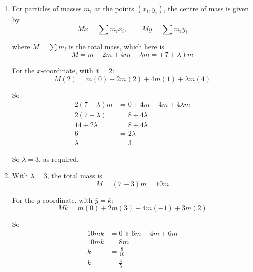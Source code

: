 \documentclass[leqno]{article}
\begin{document}
\begin{enumerate}[
  label=\textbf{\arabic*.},
  leftmargin=*,
  topsep=0pt,
  partopsep=0pt,
  parsep=0pt
]
\vspace*{10pt}

\begin{djsSolution}
\begin{enumerate}[label=\textbf{(\alph*)}, start=1]
  \item For particles of masses \(m_i\) at the points \((x_i,y_i)\), the centre of mass is given by
\[
M\bar{x}=\sum m_ix_i,\qquad M\bar{y}=\sum m_iy_i
\]

where \(M=\sum m_i\) is the total mass, which here is
\[
M=m+2m+4m+\lambda m=(7+\lambda)m
\]

For the \(x\)-coordinate, with \(\bar{x}=2\):
\[
M(2)=m(0)+2m(2)+4m(1)+\lambda m(4)
\]

So
\begin{align*}
2(7+\lambda)m&=0+4m+4m+4\lambda m\\
2(7+\lambda)&=8+4\lambda\\
14+2\lambda&=8+4\lambda\\
6&=2\lambda\\
\lambda&=3
\end{align*}

So \(\lambda=3\), as required.

  \item With \(\lambda=3\), the total mass is
\[
M=(7+3)m=10m
\]

For the \(y\)-coordinate, with \(\bar{y}=k\):
\[
Mk=m(0)+2m(3)+4m(-1)+3m(2)
\]

So
\begin{align*}
10mk&=0+6m-4m+6m\\
10mk&=8m\\
k&=\frac{8}{10}\\
k&=\frac45
\end{align*}
\end{enumerate}
\end{djsSolution}


\newpage

\questionitem

\begin{figure}[H]
    \centering
{}
\end{figure}
\end{enumerate}
\end{document}
